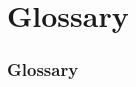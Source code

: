 \documentclass[english]{article}
\newcommand{\shortname}{GR}
\begin{document}
\newpage
\begin{htmlonly}
\end{htmlonly}
\part{Glossary}
\label{part:Glossary}

\setcounter{section}{0}
\renewcommand{\thesection}{\shortname\arabic{section}}
\renewcommand{\thesubsection}{\shortname\arabic{section}.\arabic{subsection}}
\renewcommand{\thesubsubsection}{\shortname\arabic{section}.\arabic{subsection}.\arabic{subsubsection}}

\section{Glossary}

\end{document}

